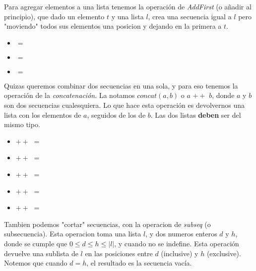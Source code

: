 \documentclass{article}
\begin{document}
Para agregar elementos a una lista tenemos la operación de \textit{AddFirst} (o añadir al principio), que dado un elemento $t$ y una lista $l$, crea una secuencia igual a $l$ pero "moviendo" todos sus elementos una posicion y dejando en la primera a $t$.

\begin{center}
	\begin{itemize}
	
		\item[]  $=$ 
		\item[]  $=$ 
		\item[]  $=$ 
	
	\end{itemize}
\end{center}

Quizas queremos combinar dos secuencias en una sola, y para eso tenemos la operación de la \textit{concatenación}. La notamos $concat(a, b)$ o $a$ $++$ $b$, donde $a$ y $b$ son dos secuencias cualesquiera. Lo que hace esta operación es devolvernos una lista con los elementos de $a$, seguidos de los de $b$. Las dos listas \textbf{deben} ser del mismo tipo.

\begin{center}
	\begin{itemize}
	
		\item[]  $++$  $=$ 
		\item[]  $++$  $=$ 
		\item[] \lista{} $++$ \lista{} $=$ \lista{}
		\item[]  $++$ \lista{} $=$ 
		\item[] \lista{} $++$  $=$ 
	
	\end{itemize}
\end{center}

Tambien podemos "cortar" secuencias, con la operacion de \textit{subseq} (o subsecuencia). Esta operacion toma una lista $l$, y dos numeros enteros $d$ y $h$, donde se cumple que $0 \leq d \leq h \leq |l|$, y cuando no se indefine. Esta operación devuelve una sublista de $l$ en las posiciones entre $d$ (inclusive) y $h$ (exclusive). Notemos que cuando $d = h$, el resultado es la secuencia vacía.
\end{document}
